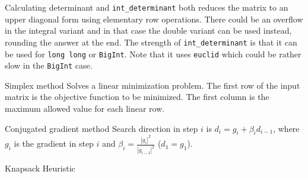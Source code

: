 \clearpage
{}
\categorycontents{}



\begin{algorithm}{Calculating determinant}
 and {\tt int\_determinant} both reduces the matrix
to an upper diagonal form using elementary row operations. There could be an
overflow in the integral variant and in that case the double variant
can be used instead, rounding the answer at the end. The strength of
{\tt int\_determinant} is that it can be used for {\tt long long} or
{\tt BigInt}. Note that it uses {\tt euclid} which could be rather
slow in the {\tt BigInt} case.
\end{algorithm}


\begin{algorithm}{Simplex method}
\desc
Solves a linear minimization problem. The first row of the
input matrix is the objective function to be minimized. The
first column is the maximum allowed value for each linear row.
\end{algorithm}

\begin{algorithm}{Conjugated gradient method}
\desc
Search direction in step $i$ is $d_i = g_i + \beta_i d_{i-1}$, where
$g_i$ is the gradient in step $i$ and $\beta_i =
\frac{|g_i|^2}{|g_{i-1}|^2}$ ($d_1 = g_1$).
\end{algorithm}

\begin{algorithm}{Knapsack Heuristic}
\end{algorithm}

